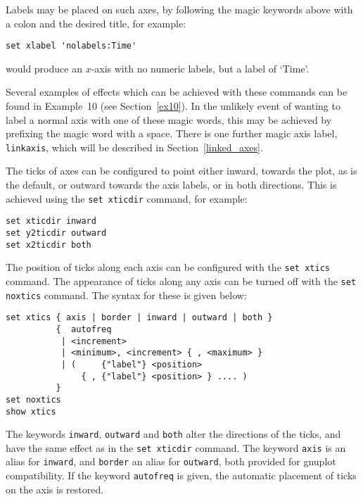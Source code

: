 \documentclass[a4paper,onecolumn,11pt]{book}
\begin{document}
Labels may be placed on such axes, by following the magic keywords above with a
colon and the desired title, for example:

\begin{verbatim}
set xlabel 'nolabels:Time'
\end{verbatim}

\noindent would produce an $x$-axis with no numeric labels, but a label of
`Time'.

Several examples of effects which can be achieved with these commands can be
found in Example~10 (see Section~\ref{ex10}).  In the unlikely event of wanting
to label a normal axis with one of these magic words, this may be achieved by prefixing the magic
word with a space. There is one further magic axis label, \texttt{linkaxis},
which will be described in Section~\ref{linked_axes}.

The ticks of axes can be configured to point either inward, towards the plot,
as is the default, or outward towards the axis labels, or in both directions.
This is achieved using the \texttt{set xticdir} command, for example:

\begin{verbatim}
set xticdir inward
set y2ticdir outward
set x2ticdir both
\end{verbatim}

The position of ticks along each axis can be configured with the \texttt{set
xtics} command. The
appearance of ticks along any axis can be turned off with the \texttt{set
noxtics} command. The
syntax for these is given below:

\begin{verbatim}
set xtics { axis | border | inward | outward | both }
          {  autofreq
           | <increment>
           | <minimum>, <increment> { , <maximum> }
           | (     {"label"} <position>
               { , {"label"} <position> } .... )
          }
set noxtics
show xtics
\end{verbatim}

The keywords \texttt{inward}, \texttt{outward} and \texttt{both} alter the
directions of the ticks, and have the same effect as in the \texttt{set
xticdir} command. The keyword \texttt{axis} is an alias for \texttt{inward},
and \texttt{border} an alias for \texttt{outward}, both provided for gnuplot
compatibility. If the keyword \texttt{autofreq} is given, the automatic
placement of ticks on the axis is restored.
\end{document}
